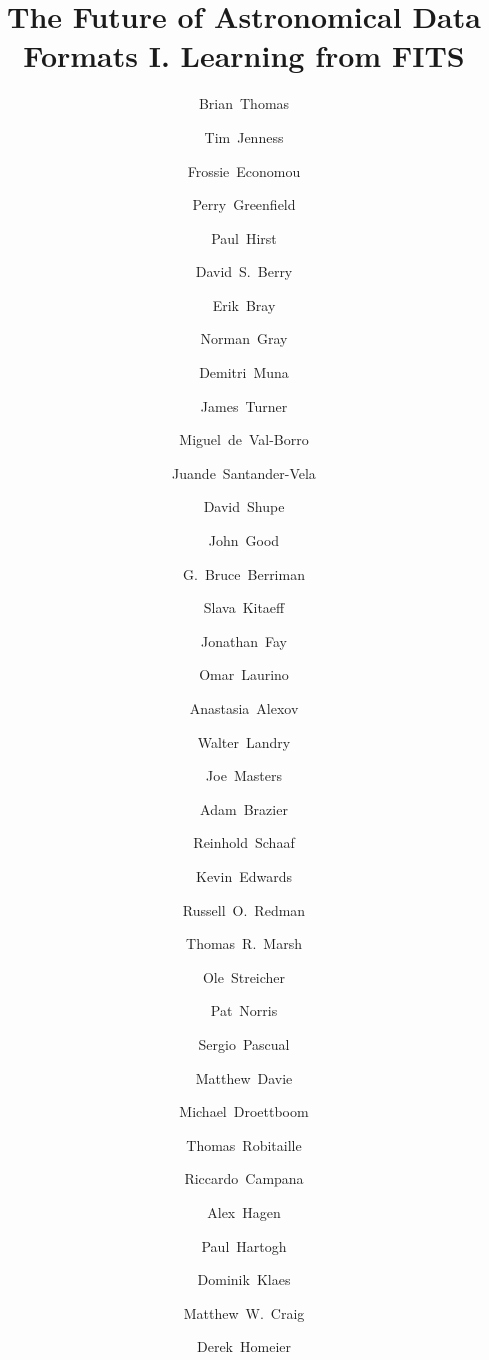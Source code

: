 \documentclass[final,authoryear,5p,times,twocolumn]{elsarticle}
\begin{document}
\begin{frontmatter}



\title{The Future of Astronomical Data Formats I. Learning from FITS}


\author[noao]{Brian~Thomas}
\author[cornell]{Tim~Jenness}
\author[noao]{Frossie~Economou}
\author[stsci]{Perry~Greenfield}
\author[geminin]{Paul~Hirst}
\author[jac]{David~S.~Berry}
\author[stsci]{Erik~Bray}
\author[glasgow]{Norman~Gray}
\author[ohio]{Demitri~Muna}
\author[geminis]{James~Turner}
\author[princeton]{Miguel~de~Val-Borro}
\author[iaa,ska]{Juande~Santander-Vela}
\author[ipac]{David~Shupe}
\author[ipac]{John~Good}
\author[ipac]{G.~Bruce~Berriman}
\author[icrar]{Slava~Kitaeff}
\author[microsoft]{Jonathan~Fay}
\author[sao]{Omar~Laurino}
\author[stsci]{Anastasia~Alexov}
\author[ipac]{Walter~Landry}
\author[nrao]{Joe~Masters}
\author[cornell]{Adam~Brazier}
\author[aifa]{Reinhold~Schaaf}
\author[uwaterloo]{Kevin~Edwards}
\author[jac]{Russell~O.~Redman}
\author[warwick]{Thomas~R.~Marsh}
\author[aip]{Ole~Streicher}
\author[noao]{Pat~Norris}
\author[ucm]{Sergio~Pascual}
\author[unsw]{Matthew~Davie}
\author[stsci]{Michael~Droettboom}
\author[mpia]{Thomas~Robitaille}
\author[iasf]{Riccardo~Campana}
\author[psu]{Alex~Hagen}
\author[mps]{Paul~Hartogh}
\author[aifa]{Dominik~Klaes}
\author[msum]{Matthew~W.~Craig}
\author[cral]{Derek~Homeier}



\end{frontmatter}
\end{document}

